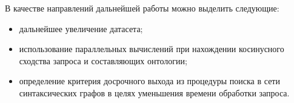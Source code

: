 %
В качестве направлений дальнейшей работы можно выделить следующие:
\begin{itemize}
	\item дальнейшее увеличение датасета;
	
	\item использование параллельных вычислений при нахождении косинусного сходства запроса и составляющих онтологии;
	
	\item определение критерия досрочного выхода из процедуры поиска в сети синтаксических графов в целях уменьшения времени обработки запроса.
\end{itemize}


\pagebreak